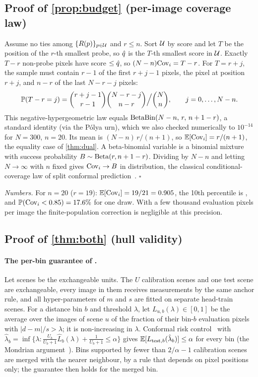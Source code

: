 \subsection{Proof of \cref{prop:budget} (per-image coverage law)}
\label{app:proof-budget}
Assume no ties among $\{R(p)\}_{p\in\cU}$ and $r\le n$.
Sort $\cU$ by score and let $T$ be the position of the $r$-th smallest probe, so $\qhat$ is the $T$-th smallest score in $\cU$.
Exactly $T-r$ non-probe pixels have score $\le\qhat$, so $(N-n)\Cov_i=T-r$.
For $T=r+j$, the sample must contain $r-1$ of the first $r+j-1$ pixels, the pixel at position $r+j$, and $n-r$ of the last $N-r-j$ pixels:
\begin{equation*}
\P(T-r=j)=\binom{r+j-1}{r-1}\binom{N-r-j}{n-r}\Big/\binom{N}{n},\qquad j=0,\dots,N-n.
\end{equation*}
This negative-hypergeometric law equals $\BetaBin(N-n,\,r,\,n+1-r)$, a standard identity (\eg via the P\'olya urn), which we also checked numerically to $10^{-14}$ for $N=300$, $n=20$.
Its mean is $(N-n)\,r/(n+1)$, so $\E[\Cov_i]=r/(n+1)$, the equality case of \cref{thm:dual}.
A beta-binomial variable is a binomial mixture with success probability $B\sim\BetaD(r,n+1-r)$.
Dividing by $N-n$ and letting $N\to\infty$ with $n$ fixed gives $\Cov_i\to B$ in distribution, the classical conditional-coverage law of split conformal prediction~\cite{vovk2012conditional}. \hfill$\square$

\noindent\emph{Numbers.} For $n=20$ ($r=19$): $\E[\Cov_i]=19/21=\NumDualCovTheory$, the 10th percentile is \NumBetaPTenTwenty, and $\P(\Cov_i<0.85)=\NumBetaShortOneTwenty\%$ for one draw.
With a few thousand evaluation pixels per image the finite-population correction is negligible at this precision.

\subsection{Proof of \cref{thm:both} (hull validity)}
\label{app:proof-both}
\paragraph{The per-bin guarantee of \mDistSplit.}
Let scenes be the exchangeable units.
The $U$ calibration scenes and one test scene are exchangeable, every image in them receives measurements by the same anchor rule, and all hyper-parameters of $m$ and $s$ are fitted on separate head-train scenes.
For a distance bin $b$ and threshold $\lambda$, let $L_{u,b}(\lambda)\in[0,1]$ be the average over the images of scene $u$ of the fraction of their bin-$b$ evaluation pixels with $|d-m|/s>\lambda$; it is non-increasing in $\lambda$.
Conformal risk control~\cite{angelopoulos2024crc} with $\hat\lambda_b=\inf\{\lambda:\frac{U_b}{U_b+1}\hat L_b(\lambda)+\frac{1}{U_b+1}\le\alpha\}$ gives $\E[L_{\text{test},b}(\hat\lambda_b)]\le\alpha$ for every bin (the Mondrian argument~\cite{vovk2005alrw}).
Bins supported by fewer than $2/\alpha-1$ calibration scenes are merged with the nearer neighbour, by a rule that depends on pixel positions only; the guarantee then holds for the merged bin.

